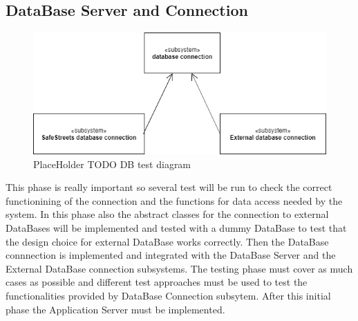 \subsection{DataBase Server and Connection}
\begin{figure}[H]
\centering
\includegraphics[width=\textwidth]{Images/TestDBdiagram.png}
\caption{\label{fig:ComWI}PlaceHolder TODO DB test diagram}
\end{figure}
This phase is really important so several test will be run to check the correct functionining of the connection and the functions for data access needed by the system. In this phase also the abstract classes for the connection to external DataBases will be implemented and tested with a dummy DataBase to test that the design choice for external DataBase works correctly. Then the DataBase connnection is implemented and integrated with the DataBase Server and the External DataBase connection subsystems.
The testing phase must cover as much cases as possible and different test approaches must be used to test the functionalities provided by DataBase Connection subsytem.
After this initial phase the Application Server must be implemented.
